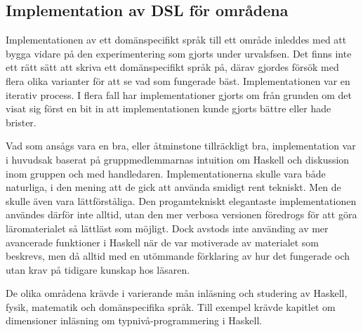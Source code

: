 \begin{draft}

\subsection{Implementation av DSL för områdena}

Implementationen av ett domänspecifikt språk till ett område inleddes med att bygga vidare på den experimentering som gjorts under urvalsfsen. Det finns inte ett rätt sätt att skriva ett domänspecifikt språk på, därav gjordes försök med flera olika varianter för att se vad som fungerade bäst. Implementationen var en iterativ process. I flera fall har implementationer gjorts om från grunden om det visat sig först en bit in att implementationen kunde gjorts bättre eller hade brister.

Vad som ansågs vara en bra, eller åtminstone tillräckligt bra, implementation var i huvudsak baserat på gruppmedlemmarnas intuition om Haskell och diskussion inom gruppen och med handledaren. Implementationerna skulle vara både naturliga, i den mening att de gick att använda smidigt rent tekniskt. Men de skulle även vara lättförståliga. Den progamtekniskt elegantaste implementationen användes därför inte alltid, utan den mer verbosa versionen föredrogs för att göra läromaterialet så lättläst som möjligt. Dock avstods inte använding av mer avancerade funktioner i Haskell när de var motiverade av materialet som beskrevs, men då alltid med en utömmande förklaring av hur det fungerade och utan krav på tidigare kunskap hos läsaren.

De olika områdena krävde i varierande mån inläsning och studering av Haskell,
fysik, matematik och domänspecifika språk. Till exempel krävde kapitlet om
dimensioner inläsning om typnivå-programmering i Haskell. 

\end{draft}


